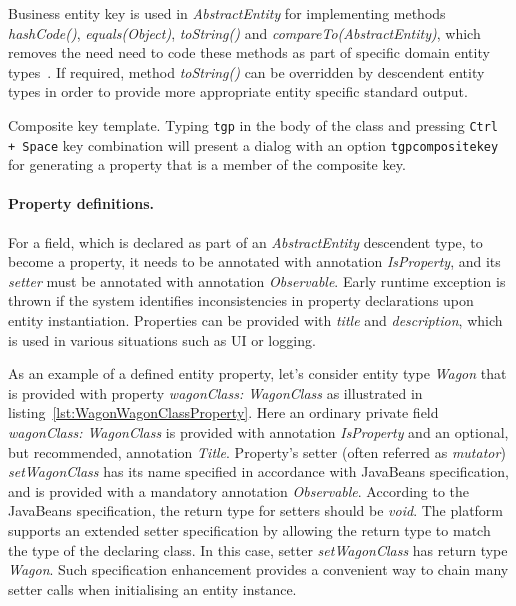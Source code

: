   Business entity key is used in \emph{AbstractEntity} for implementing methods \emph{hashCode()}, \emph{equals(Object)}, \emph{toString()} and \emph{compareTo(AbstractEntity)}, which removes the need  need to code these methods as part of specific domain entity types~\cite{Bloch2008}.
  If required, method \emph{toString()} can be overridden by descendent entity types in order to provide more appropriate entity specific standard output.

  \begin{notebox}{Composite key template.}{\label{nb:EclipseTemplatesForCompositeKey}}
    Typing \texttt{tgp} in the body of the class and pressing \texttt{Ctrl + Space} key combination will present a dialog with an option \texttt{tgpcompositekey} for generating a property that is a member of the composite key.
  \end{notebox}

  \paragraph*{Property definitions.}
  
  For a field, which is declared as part of an \emph{AbstractEntity} descendent type, to become a property, it needs to be annotated with annotation \emph{IsProperty}, and its \emph{setter} must be annotated with annotation \emph{Observable}.
  Early runtime exception is thrown if the system identifies inconsistencies in property declarations upon entity instantiation.
  Properties can be provided with \emph{title} and \emph{description}, which is used in various situations such as UI or logging.
  
  As an example of a defined entity property, let's consider entity type \emph{Wagon} that is provided with property \emph{wagonClass: WagonClass} as illustrated in listing~\ref{lst:WagonWagonClassProperty}.
  Here an ordinary private field \emph{wagonClass: WagonClass} is provided with annotation \emph{IsProperty} and an optional, but recommended, annotation \emph{Title}.
  Property's setter (often referred as \emph{mutator}) \emph{setWagonClass} has its name specified in accordance with JavaBeans specification, and is provided with a mandatory annotation \emph{Observable}.
  According to the JavaBeans specification, the return type for setters should be \emph{void}.
  The platform supports an extended setter specification by allowing the return type to match the type of the declaring class.
  In this case, setter \emph{setWagonClass} has return type \emph{Wagon}.
  Such specification enhancement provides a convenient way to chain many setter calls when initialising an entity instance.
  

